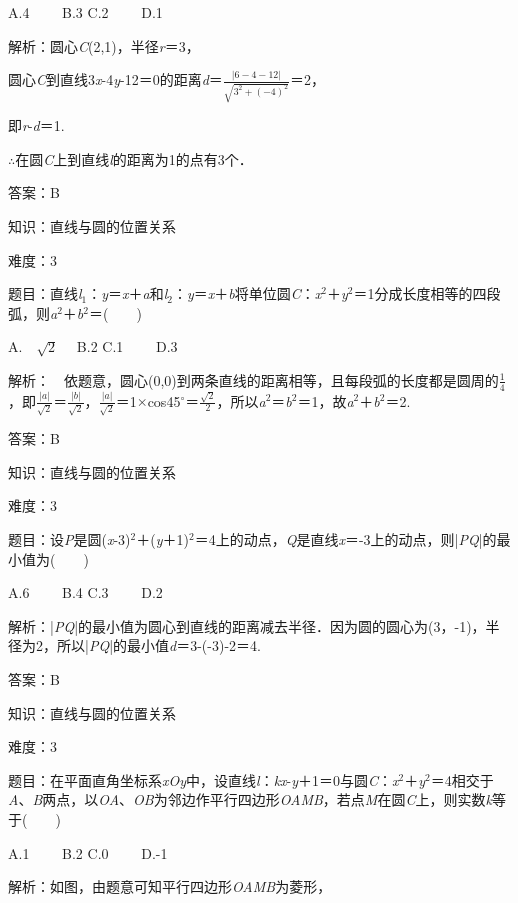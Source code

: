 \documentclass{article} %
\begin{document}
A.4　　 B.3  C.2　　 D.1

解析：圆心\textit{C}(2,1)，半径\textit{r}＝3，

圆心\textit{C}到直线3\textit{x}-4\textit{y}-12＝0的距离\textit{d}＝$\frac{|6-4-12|}{\sqrt{3^2+(-4)^2}}$＝2，

即\textit{r}-\textit{d}＝1.

$\mathrm{\therefore}$在圆\textit{C}上到直线\textit{l}的距离为1的点有3个．

答案：B

知识：直线与圆的位置关系

难度：3

题目：直线\textit{l}${}_{1}$：\textit{y}＝\textit{x}＋\textit{a}和\textit{l}${}_{2}$：\textit{y}＝\textit{x}＋\textit{b}将单位圆\textit{C}：\textit{x}${}^{2}$＋\textit{y}${}^{2}$＝1分成长度相等的四段弧，则\textit{a}${}^{2}$＋\textit{b}${}^{2}$＝(　　)

A.　$\sqrt{2}$　 B.2  C.1　　 D.3

解析：　依题意，圆心(0,0)到两条直线的距离相等，且每段弧的长度都是圆周的$\frac{1}{4}$，即$\frac{|a|}{\sqrt{2}}$＝$\frac{|b|}{\sqrt{2}}$，$\frac{|a|}{\sqrt{2}}$＝1$\mathrm{\times}$cos45$\mathrm{{}^\circ}$＝$\frac{\sqrt{2}}{2}$，所以\textit{a}${}^{2}$＝\textit{b}${}^{2}$＝1，故\textit{a}${}^{2}$＋\textit{b}${}^{2}$＝2.

答案：B

知识：直线与圆的位置关系

难度：3

题目：设\textit{P}是圆(\textit{x}-3)${}^{2}$＋(\textit{y}＋1)${}^{2}$＝4上的动点，\textit{Q}是直线\textit{x}＝-3上的动点，则|\textit{PQ}|的最小值为(　　)

A.6　　 B.4  C.3　　 D.2

解析：|\textit{PQ}|的最小值为圆心到直线的距离减去半径．因为圆的圆心为(3，-1)，半径为2，所以|\textit{PQ}|的最小值\textit{d}＝3-(-3)-2＝4.

答案：B

知识：直线与圆的位置关系

难度：3

题目：在平面直角坐标系\textit{xOy}中，设直线\textit{l}：\textit{kx}-\textit{y}＋1＝0与圆\textit{C}：\textit{x}${}^{2}$＋\textit{y}${}^{2}$＝4相交于\textit{A}、\textit{B}两点，以\textit{OA}、\textit{OB}为邻边作平行四边形\textit{OAMB}，若点\textit{M}在圆\textit{C}上，则实数\textit{k}等于(　　)

A.1　　 B.2  C.0　　 D.-1

解析：如图，由题意可知平行四边形\textit{OAMB}为菱形，
\end{document}
